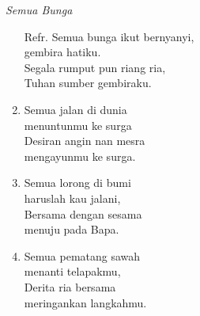 \small
\begin{center}
\itshape{Semua Bunga}
\end{center}

\itshape{
\begin{enumerate}
\item [Refr.] Semua bunga ikut bernyanyi,\\
 gembira hatiku.\\
Segala rumput pun riang ria, \\
Tuhan sumber gembiraku.

\item Semua jalan di dunia\\
 menuntunmu ke surga\\
Desiran angin nan mesra\\
mengayunmu ke surga. 

\item Semua lorong di bumi \\
haruslah kau jalani,\\
Bersama dengan sesama \\
menuju pada Bapa.

\item Semua pematang sawah\\ 
menanti telapakmu,\\
Derita ria bersama \\
meringankan langkahmu.
\end{enumerate}
}
\normalsize
